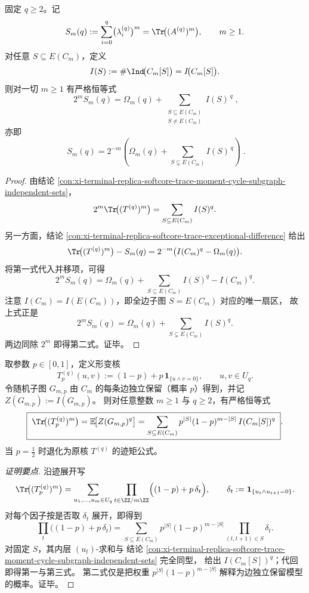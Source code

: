 \begin{conclusion}\label{con:xi-terminal-replica-softcore-exceptional-power-sum-cycle-sector-replacement}
固定 \(q\ge2\)。记
\[
S_m(q):=\sum_{i=0}^{q}\bigl(\lambda_i^{(q)}\bigr)^m=\Tr\!\bigl((A^{(q)})^m\bigr),\qquad m\ge1.
\]
对任意 \(S\subseteq E(C_m)\)，定义
\[
I(S):=\#\Ind\!\bigl(C_m[S]\bigr)=I\!\bigl(C_m[S]\bigr).
\]
则对一切 \(m\ge1\) 有严格恒等式
\[
\boxed{\;
2^mS_m(q)=\Omega_m(q)+\sum_{\substack{S\subseteq E(C_m)\\ S\neq E(C_m)}} I(S)^{\,q}\; } ,
\]
亦即
\[
\boxed{\;
S_m(q)=2^{-m}\!\left(\Omega_m(q)+\sum_{S\subsetneq E(C_m)} I(S)^{\,q}\right)\; }.
\]
\end{conclusion}
\begin{proof}
由结论 \ref{con:xi-terminal-replica-softcore-trace-moment-cycle-subgraph-independent-sets}，
\[
2^m\Tr\!\bigl((T^{(q)})^m\bigr)=\sum_{S\subseteq E(C_m)}I(S)^q.
\]
另一方面，结论 \ref{con:xi-terminal-replica-softcore-trace-exceptional-difference} 给出
\[
\Tr\!\bigl((T^{(q)})^m\bigr)-S_m(q)=2^{-m}\bigl(I(C_m)^q-\Omega_m(q)\bigr).
\]
将第一式代入并移项，可得
\[
2^mS_m(q)=\Omega_m(q)+\sum_{S\subseteq E(C_m)}I(S)^q-I(C_m)^q.
\]
注意 \(I(C_m)=I(E(C_m))\)，即全边子图 \(S=E(C_m)\) 对应的唯一扇区，
故上式正是
\[
2^mS_m(q)=\Omega_m(q)+\sum_{S\subsetneq E(C_m)}I(S)^q.
\]
两边同除 \(2^m\) 即得第二式。证毕。
\end{proof}

\begin{conclusion}[边伯努利形变下的随机环图独立集矩表示]\label{con:xi-terminal-replica-softcore-trace-moment-bernoulli-deformation-random-cycle}
取参数 \(p\in[0,1]\)，定义形变核
\[
T^{(q)}_{p}(u,v):=(1-p)+p\,\mathbf{1}_{\{u\wedge v=0\}},
\qquad u,v\in U_q.
\]
令随机子图 \(G_{m,p}\) 由 \(C_m\) 的每条边独立保留（概率 \(p\)）得到，并记
\(
Z(G_{m,p}):=I(G_{m,p})
\)。
则对任意整数 \(m\ge 1\) 与 \(q\ge 2\)，有严格恒等式
\[
\boxed{\;
\Tr\!\bigl((T^{(q)}_{p})^m\bigr)
=\mathbb E\!\bigl[Z(G_{m,p})^{q}\bigr]
=\sum_{S\subseteq E(C_m)}p^{|S|}(1-p)^{m-|S|}\,I(C_m[S])^{q}\; } .
\]
当 \(p=\tfrac12\) 时退化为原核 \(T^{(q)}\) 的迹矩公式。
\end{conclusion}
\begin{proof}[证明要点]
沿迹展开写
\[
\Tr\!\bigl((T^{(q)}_{p})^m\bigr)
=\sum_{u_1,\dots,u_m\in U_q}\prod_{t\in\ZZ/m\ZZ}\Bigl((1-p)+p\,\delta_t\Bigr),
\qquad
\delta_t:=\mathbf 1_{\{u_t\wedge u_{t+1}=0\}}.
\]
对每个因子按是否取 \(\delta_t\) 展开，即得到
\[
\prod_t\bigl((1-p)+p\,\delta_t\bigr)
=\sum_{S\subseteq E(C_m)}p^{|S|}(1-p)^{m-|S|}\prod_{(t,t+1)\in S}\delta_t.
\]
对固定 \(S\)，其内层 \((u_t)\)-求和与
结论 \ref{con:xi-terminal-replica-softcore-trace-moment-cycle-subgraph-independent-sets} 完全同型，
给出 \(I(C_m[S])^{q}\)；代回即得第一与第三式。
第二式仅是把权重 \(p^{|S|}(1-p)^{m-|S|}\) 解释为边独立保留模型的概率。证毕。
\end{proof}

